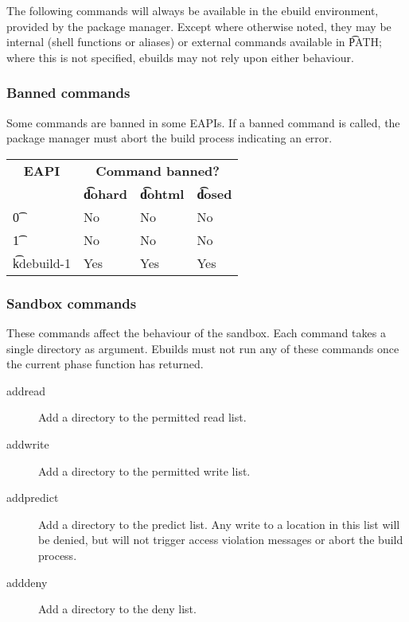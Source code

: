 \label{pkg-mgr-commands}

The following commands will always be available in the ebuild environment, provided by the package
manager. Except where otherwise noted, they may be internal (shell functions or aliases) or external
commands available in \t{PATH}; where this is not specified, ebuilds may not rely upon either
behaviour.

\IFKDEBUILDELSE
{
    \subsubsection{Banned commands}
    \label{banned-commands}

    Some commands are banned in some EAPIs. If a banned command is called, the package manager must
    abort the build process indicating an error.

    \begin{table}
    \centering
     \label{banned-commands-table}
    \begin{tabular}{ l l l l }
        \toprule
        \multicolumn{1}{c}{\textbf{EAPI}} &
        \multicolumn{3}{c}{\textbf{Command banned?}} \\
        \multicolumn{1}{c}{} &
        \multicolumn{1}{c}{\textbf{\t{dohard}}} &
        \multicolumn{1}{c}{\textbf{\t{dohtml}}} &
        \multicolumn{1}{c}{\textbf{\t{dosed}}} \\
        \midrule
    \t{0} & No & No & No \\
    \t{1} & No & No & No \\
    \t{kdebuild-1} & Yes & Yes & Yes \\
    \bottomrule
    \end{tabular}
    \end{table}
}{
}

\subsubsection{Sandbox commands}
These commands affect the behaviour of the sandbox. Each command takes a single directory as
argument. Ebuilds must not run any of these commands once the current phase function has returned.
\begin{description}
\item[addread] Add a directory to the permitted read list.
\item[addwrite] Add a directory to the permitted write list.
\item[addpredict] Add a directory to the predict list. Any write to a location in this list will be
    denied, but will not trigger access violation messages or abort the build process.
\item[adddeny] Add a directory to the deny list.
\end{description}

